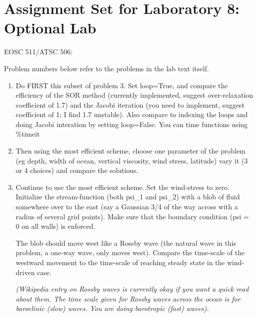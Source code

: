 \documentclass[12pt]{article}
\begin{document}
\section*{Assignment Set for Laboratory 8: Optional Lab}

EOSC 511/ATSC 506: 

Problem numbers below refer to the problems in the lab text itself.



\begin{enumerate}
\item Do FIRST this subset of problem 3.  Set loop=True, and  compare the efficiency of the 
SOR method (currently implemented, suggest over-relaxation coefficient
of 1.7) and the Jacobi iteration (you need to implement, suggest
coefficient of 1; I find 1.7 unstable).  Also compare to indexing the
loops and doing Jacobi interation by setting loop=False.  You can
time functions using \%timeit

\item Then using the most efficient scheme, 
choose one parameter of the problem
(eg depth, width of ocean, vertical viscosity, wind stress, latitude)
vary it (3 or 4 choices) and compare the solutions.

\item Continue to use the most efficient scheme. Set the wind-stress to zero.
Initialize the stream-function (both psi\_1 and psi\_2) with a blob of fluid somewhere over to the east (say a Gaussian 3/4 of the way across with a radius of several grid points).  Make sure that the boundary condition (psi = 0 on all walls) is enforced.

The blob should move west like a Rossby wave (the natural wave in this problem, a one-way wave, only moves west).  Compare the time-scale of the westward movement to the time-scale of reaching steady state in the wind-driven case.


{\it (Wikipedia entry on Rossby waves is currently okay if you want a quick read about them.  The time scale given for Rossby waves across the ocean is for baroclinic (slow) waves.  You are doing barotropic (fast) waves).}


\end{enumerate}
\end{document}
